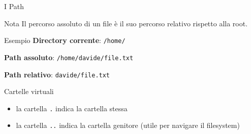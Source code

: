 \documentclass{beamer}
\begin{document}
    \begin{frame}{I Path}
        \begin{alertblock}{Nota}
            Il percorso assoluto di un file è il suo percorso relativo rispetto
            alla root.
        \end{alertblock}

        \begin{exampleblock}{Esempio}
            \textbf{Directory corrente}: \texttt{/home/}

            \textbf{Path assoluto}: \texttt{/home/davide/file.txt}

            \textbf{Path relativo}: \texttt{davide/file.txt}
        \end{exampleblock}

        \begin{block}{Cartelle virtuali}
            \begin{itemize}
                \item la cartella \texttt{.} indica la cartella stessa
                \item la cartella \texttt{..} indica la cartella genitore (utile per navigare il filesystem)
            \end{itemize}
        \end{block}
    \end{frame}
\end{document}
